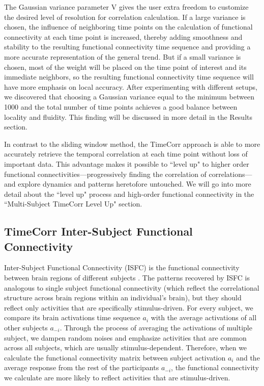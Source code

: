 \documentclass[11pt]{article}
\begin{document}
The Gaussian variance parameter V gives the user extra freedom to customize the desired level of resolution for correlation calculation. If a large variance is chosen, the influence of neighboring time points on the calculation of functional connectivity at each time point is increased, thereby adding smoothness and stability to the resulting functional connectivity time sequence and providing a more accurate representation of the general trend. But if a small variance is chosen, most of the weight will be placed on the time point of interest and its immediate neighbors, so the resulting functional connectivity time sequence will have more emphasis on local accuracy. After experimenting with different setups, we discovered that choosing a Gaussian variance equal to the minimum between 1000 and the total number of time points achieves a good balance between locality and fluidity. This finding will be discussed in more detail in the Results section.

In contrast to the sliding window method, the TimeCorr approach is able to more accurately retrieve the temporal correlation at each time point without loss of important data. This advantage makes it possible to ``level up" to higher order functional connectivities---progressively finding the correlation of correlations---and explore dynamics and patterns heretofore untouched. We will go into more detail about the ``level up" process and high-order functional connectivity in the ``Multi-Subject TimeCorr Level Up" section.

\subsection{TimeCorr Inter-Subject Functional Connectivity}

Inter-Subject Functional Connectivity (ISFC) is the functional connectivity between brain regions of different subjects \citep{jeremy2017}\citep{hasson2016}. The patterns recovered by ISFC is analogous to single subject functional connectivity (which reflect the correlational structure across brain regions within an individual's
brain), but they should reflect only activities that are specifically stimulus-driven. For every subject, we compare its brain activations time sequence $a_i$ with the average activations of all other subjects $a_{-i}$. Through the process of averaging the activations of multiple subject, we dampen random noises and emphasize activities that are common across all subjects, which are usually stimulus-dependent. Therefore, when we calculate the functional connectivity matrix between subject activation $a_i$ and the average response from the rest of the participants $a_{-i}$, the functional connectivity we calculate are more likely to reflect activities that are stimulus-driven.
\end{document}

